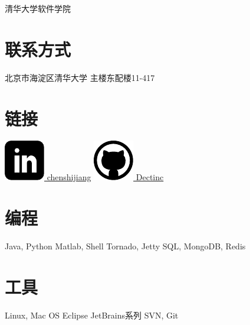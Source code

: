 \documentclass[]{friggeri-cv-cn}
\begin{document}
       {清华大学软件学院~}

\begin{aside}
  \section{联系方式}
    北京市海淀区清华大学
    主楼东配楼11-417
  \section{链接}
    \href{http://www.linkedin.com/in/chenshijiang}{\includegraphics[width=.8em]{icons/linkedin.pdf} chenshijiang}
    \href{https://github.com/Dectinc}{\includegraphics[width=.9em]{icons/github.pdf} Dectinc}
  \section{编程}
    Java, Python
    Matlab, Shell
    Tornado, Jetty
    SQL, MongoDB, Redis
  \section{工具}
    Linux, Mac OS
    Eclipse
    JetBrains系列
    SVN, Git
\end{aside}
\end{document}
